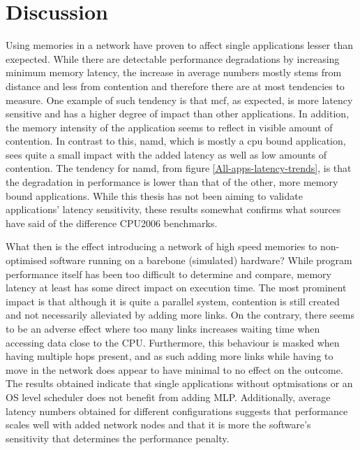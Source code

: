 \chapter{Discussion}
Using memories in a network have proven to affect single applications lesser than exepected. While there are detectable performance degradations by increasing minimum memory latency, the increase in average numbers mostly stems from distance and less from contention and therefore there are at most tendencies to measure. One example of such tendency is that mcf, as expected, is more latency sensitive and has a higher degree of impact than other applications. In addition, the memory intensity of the application seems to reflect in visible amount of contention. In contrast to this, namd, which is mostly a cpu bound application, sees quite a small impact with the added latency as well as low amounts of contention. The tendency for namd, from figure \ref{All-apps-latency-trends}, is that the degradation in performance is lower than that of the other, more memory bound applications. While this thesis has not been aiming to validate applications' latency sensitivity, these results somewhat confirms what sources have said of the difference CPU2006 benchmarks.
\bigskip

What then is the effect introducing a network of high speed memories to non-optimised software running on a barebone (simulated) hardware? While program performance itself has been too difficult to determine and compare, memory latency at least has some direct impact on execution time. The most prominent impact is that although it is quite a parallel system, contention is still created and not necessarily alleviated by adding more links. On the contrary, there seems to be an adverse effect where too many links increases waiting time when accessing data close to the CPU. Furthermore, this behaviour is masked when having multiple hops present, and as such adding more links while having to move in the network does appear to have minimal to no effect on the outcome. The results obtained indicate that single applications without optmisations or an OS level scheduler does not benefit from adding MLP. Additionally, average latency numbers obtained for different configurations suggests that performance scales well with added network nodes and that it is more the software's sensitivity that determines the performance penalty. 
\bigskip

